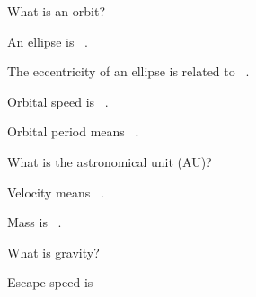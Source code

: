 \documentclass[addpoints]{exam}
\begin{document}
\begin{questions}


\question
What is an orbit?

\question
An ellipse is \fillin\ .

\question
The eccentricity of an ellipse is related to \fillin\ .

\question
Orbital speed is \fillin\ .

\question 
Orbital period means \fillin\ . 

\question
What is the astronomical unit (AU)?

\question
Velocity means \fillin\ .

\question 
Mass is \fillin\ .

\question
What is gravity?

\question
Escape speed is \fillin\ 



\end{questions}
\end{document}
